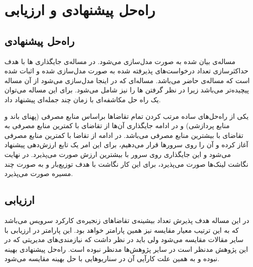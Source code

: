 \chapter{راه‌حل پیشنهادی و ارزیابی}

\section{راه‌حل پیشنهادی}

مساله‌ی بیان شده به صورت 
مدل‌سازی می‌شود.
در \cite{Eramo2016}
مساله‌ی جایگذاری ها با هدف حداکثرسازی تعداد درخواست‌های پذیرفته شده
به صورت  مدل‌سازی شده و اثبات شده است که مساله‌ی حاضر  می‌باشد.
مساله‌ای که در اینجا مدل‌سازی می‌شود از آن مساله پیچیده‌تر می‌باشد زیرا در نظر گرفتن ها را نیز شامل می‌شود.
برای این مساله می‌توان
یک راه حل مکاشفه‌ای با زمان چند جمله‌ای
پیشنهاد داد.

یکی از راه‌حل‌های ساده مرتب کردن تمام تقاضاها براساس منابع مصرفی (پهنای باند و منابع پردازشی)
و در ادامه جایگذاری آن‌ها از تقاضای با کمترین منابع مصرفی به تقاضای با بیشترین منابع مصرفی می‌باشد.
در ادامه از تقاضا با کمترین منابع مصرفی آغاز کرده و آن را روی سرورها قرار می‌دهیم، برای این امر یک تابع ارزش‌دهی پیشنهاد می‌شود
و این جایگذاری روی سرور با بیشترین ارزش صورت می‌پذیرد.
در نهایت نگاشت لینک‌ها صورت می‌پذیرد، برای این کار نگاشت با هدف توزیع‌بار و به صورت چند مسیره صورت می‌پذیرد.

\section{ارزیابی}

در این مساله هدف پذیرش تعداد بیشینه‌ی تقاضاهای زنجیره‌ی کارکرد سرویس می‌باشد که به این ترتیب معیار مقایسه نیز همین پارامتر خواهد بود. این پارامتر در ارزیابی با سایر مقالات مقایسه می‌شود ولی باید در نظر داشت که نیازمندی‌های مدیریتی که در این پژوهش مدنظر است در سایر پژوهش‌ها مدنظر نبوده است.
راه‌حل پیشنهادی بهینه نبوده و به همین علت کارآیی آن در سناریوهایی با حل بهینه مقایسه می‌شود.
